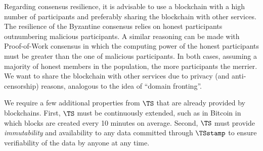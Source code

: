 Regarding consensus resilience, it is advisable to use a blockchain with a high 
number of participants and preferably sharing the blockchain with other 
services.
The resilience of the Byzantine consensus relies on honest participants outnumbering malicious participants.
A similar reasoning can be made with Proof-of-Work consensus in which the computing power of the honest participants must be greater than the one of malicious participants.
In both cases, assuming a majority of honest members in the population, the more participants the merrier.
We want to share the blockchain with other services due to privacy (and 
anti-censorship) reasons, analogous to the idea of \enquote{domain fronting}.

We require a few additional properties from \(\TS\) that are already provided by blockchains.
First, \(\TS\) must be continuously extended, such as in Bitcoin in which blocks are created every 10 minutes on average.
Second, \(\TS\) must provide \emph{immutability} and availability to any data committed through \(\TSstamp\) to ensure verifiability of the data by anyone at any time.


